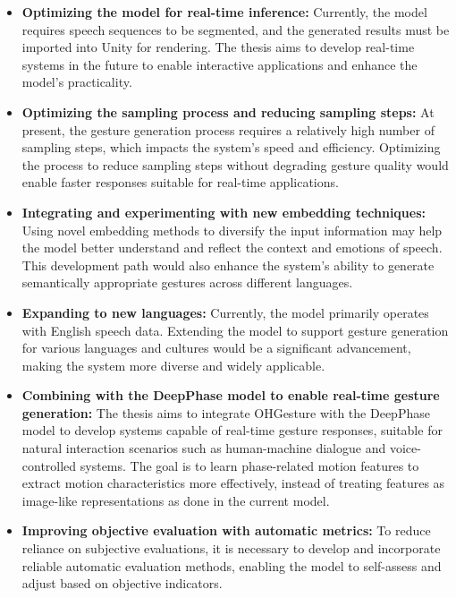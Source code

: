 \begin{itemize}
	\item \textbf{Optimizing the model for real-time inference:} Currently, the model requires speech sequences to be segmented, and the generated results must be imported into Unity for rendering. The thesis aims to develop real-time systems in the future to enable interactive applications and enhance the model's practicality.
	
	\item \textbf{Optimizing the sampling process and reducing sampling steps:} At present, the gesture generation process requires a relatively high number of sampling steps, which impacts the system’s speed and efficiency. Optimizing the process to reduce sampling steps without degrading gesture quality would enable faster responses suitable for real-time applications.
	
	\item \textbf{Integrating and experimenting with new embedding techniques:} Using novel embedding methods to diversify the input information may help the model better understand and reflect the context and emotions of speech. This development path would also enhance the system’s ability to generate semantically appropriate gestures across different languages.
	
	\item \textbf{Expanding to new languages:} Currently, the model primarily operates with English speech data. Extending the model to support gesture generation for various languages and cultures would be a significant advancement, making the system more diverse and widely applicable.
	
	\item \textbf{Combining with the DeepPhase model \cite{starke2022deepphase} to enable real-time gesture generation:} The thesis aims to integrate OHGesture with the DeepPhase model to develop systems capable of real-time gesture responses, suitable for natural interaction scenarios such as human-machine dialogue and voice-controlled systems. The goal is to learn phase-related motion features to extract motion characteristics more effectively, instead of treating features as image-like representations as done in the current model.
	
	\item \textbf{Improving objective evaluation with automatic metrics:} To reduce reliance on subjective evaluations, it is necessary to develop and incorporate reliable automatic evaluation methods, enabling the model to self-assess and adjust based on objective indicators.
\end{itemize}


